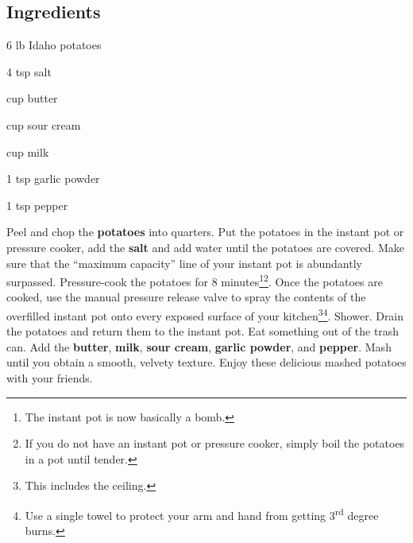 \newpage
{}

\subsection*{Ingredients}
\begin{ingredients}
	\item 6 lb Idaho potatoes
	\item 4 tsp salt
	\item {} cup butter
	\item {} cup sour cream
	\item {} cup milk
	\item 1 tsp garlic powder
	\item 1 tsp pepper
\end{ingredients}

\medskip

Peel and chop the \textbf{potatoes} into quarters.
Put the potatoes in the instant pot or pressure cooker, add the \textbf{salt} and add water until the potatoes are covered. 
Make sure that the ``maximum capacity'' line of your instant pot is abundantly surpassed. 
Pressure-cook the potatoes for 8 minutes\footnote{The instant pot is now basically a bomb.}\footnote{If you do not have an instant pot or pressure cooker, simply boil the potatoes in a pot until tender.}.
Once the potatoes are cooked, use the manual pressure release valve to spray the contents of the overfilled instant pot onto every exposed surface of your kitchen\footnote{This includes the ceiling.}\footnote{Use a single towel to protect your arm and hand from getting 3\textsuperscript{rd} degree burns.}.
Shower.
Drain the potatoes and return them to the instant pot. 
Eat something out of the trash can.
Add the \textbf{butter}, \textbf{milk}, \textbf{sour cream}, \textbf{garlic powder}, and \textbf{pepper}. 
Mash until you obtain a smooth, velvety texture. 
Enjoy these delicious mashed potatoes with your friends.

\vspace*{0.75 cm}

\begin{recipeblock}
	
\end{recipeblock}